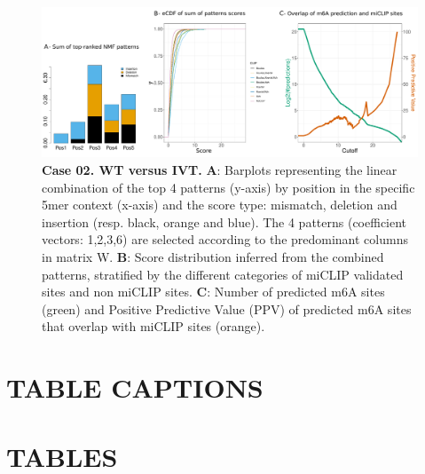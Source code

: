 \documentclass[times, 11pt, a4paper]{article}
\begin{document}
\newpage
\begin{figure}[h!]
	\includegraphics[width = 1\textwidth]{img/wt_ivt.pdf}
	\caption{\textbf{Case 02. WT  versus IVT.}  \textbf{A}: Barplots representing the linear combination of the top 4 patterns (y-axis) by position in the specific 5mer context (x-axis) and the score type: mismatch, deletion and insertion (resp. black, orange and blue). The 4 patterns (coefficient vectors: 1,2,3,6) are selected according to the predominant columns in matrix W.  \textbf{B}: Score distribution inferred from the combined patterns, stratified by the different categories of miCLIP validated sites and non miCLIP sites.  \textbf{C}: Number of predicted m6A sites (green) and Positive Predictive Value (PPV) of predicted m6A sites that overlap with miCLIP sites (orange). }
	\label{fig:WT_IVT}
\end{figure}
\newpage
\section*{TABLE CAPTIONS}
\section*{TABLES}
\end{document}
